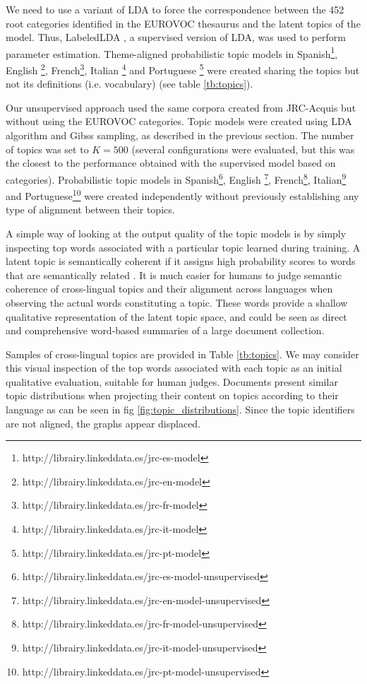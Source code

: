  We need to use a variant of LDA to force the correspondence between the 452 root categories identified in the EUROVOC thesaurus and the latent topics of the model. Thus, LabeledLDA \citep{Ramage2009a}, a supervised version of LDA, was used to perform parameter estimation. Theme-aligned probabilistic topic models in Spanish\footnote{http://librairy.linkeddata.es/jrc-es-model}, English \footnote{http://librairy.linkeddata.es/jrc-en-model}, French\footnote{http://librairy.linkeddata.es/jrc-fr-model}, Italian \footnote{http://librairy.linkeddata.es/jrc-it-model} and Portuguese \footnote{http://librairy.linkeddata.es/jrc-pt-model} were created sharing the topics but not its definitions (i.e. vocabulary) (see table \ref{tb:topics}).

 Our unsupervised approach used the same corpora created from JRC-Acquis but without using the EUROVOC categories. Topic models were created using LDA algorithm and Gibss sampling, as described in the previous section. The number of topics was set to $K=500$ (several configurations were evaluated, but this was the closest to the performance obtained with the supervised model based on categories). Probabilistic topic models in Spanish\footnote{http://librairy.linkeddata.es/jrc-es-model-unsupervised}, English \footnote{http://librairy.linkeddata.es/jrc-en-model-unsupervised}, French\footnote{http://librairy.linkeddata.es/jrc-fr-model-unsupervised}, Italian\footnote{http://librairy.linkeddata.es/jrc-it-model-unsupervised} and Portuguese\footnote{http://librairy.linkeddata.es/jrc-pt-model-unsupervised} were created independently without previously establishing any type of alignment between their topics. 
 
A simple way of looking at the output quality of the topic models is by simply inspecting top words associated with a particular topic learned during training. A latent topic is semantically coherent if it assigns high probability scores to words that are semantically related \citep{Gliozzo2007, newman-etal-2010-automatic, mimno-etal-2011-optimizing}. It is much easier for humans to judge semantic coherence of cross-lingual topics and their alignment across languages when observing the actual words constituting a topic. These words provide a shallow qualitative representation of the latent topic space, and could be seen as direct and comprehensive word-based summaries of a large document collection.

Samples of cross-lingual topics are provided in Table \ref{tb:topics}. We may consider this visual inspection of the top words associated with each topic as an initial qualitative evaluation, suitable for human judges. Documents present similar topic distributions when projecting their content on topics according to their language as can be seen in fig \ref{fig:topic_distributions}. Since the topic identifiers are not aligned, the graphs appear displaced.

